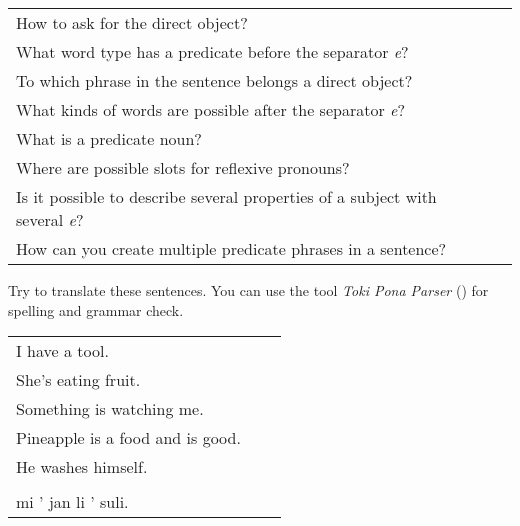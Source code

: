 \begin{supertabular}{p{5,5cm}|ll}
How to ask for the direct object? &&  \\ %
What word type has a predicate before the separator \textit{e}?  &&  \\ %
To which phrase in the sentence belongs a direct object? &&  \\ %
What kinds of words are possible after the separator \textit{e}?  &&  \\ %
What is a predicate noun?  &&  \\ %
Where are possible slots for reflexive pronouns? &&  \\ %
Is it possible to describe several properties of a subject with several \textit{e}? &&  \\ %
How can you create multiple predicate phrases in a sentence?  &&  \\ %
\end{supertabular} 

Try to translate these sentences. 
You can use the tool \textit{Toki Pona Parser} (\cite{www:rowa:02}) for spelling and grammar check. 

\begin{supertabular}{p{5,5cm}|ll}
I have a tool. &&  \\ %
She's eating fruit. &&  \\ %
Something is watching me. &&  \\ %
Pineapple is a food and is good. &&  \\ %
He washes himself. &&  \\ %
  && \\ %
mi ' jan li ' suli. &&  \\ %
\end{supertabular} 
